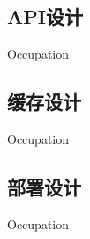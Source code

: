
\subsection{API设计}
\indent
Occupation

\subsection{缓存设计}
\indent
Occupation

\subsection{部署设计}
\indent
Occupation